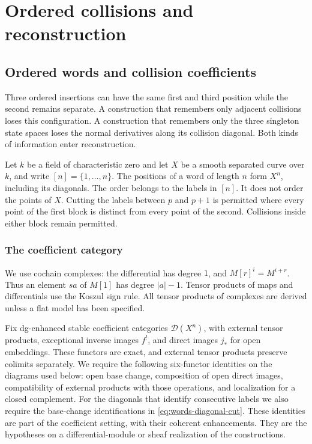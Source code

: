 \part{Ordered collisions and reconstruction}

\chapter{Ordered words and collision coefficients}
\label{chap:collision-words}

Three ordered insertions can have the same first and third position while
the second remains separate.  A construction that remembers only adjacent
collisions loses this configuration.  A construction that remembers only
the three singleton state spaces loses the normal derivatives along its
collision diagonal.  Both kinds of information enter reconstruction.

Let \(k\) be a field of characteristic zero and let \(X\) be a smooth
separated curve over \(k\), and write \([n]=\{1,\ldots,n\}\).
The positions of a word of length \(n\) form \(X^n\), including its
diagonals.  The order belongs to the labels in \([n]\).
It does not order the points of \(X\).  Cutting the labels
between \(p\) and \(p+1\) is permitted where every point of the first
block is distinct from every point of the second.  Collisions inside
either block remain permitted.

\section{The coefficient category}

We use cochain complexes: the differential has degree \(1\), and
\(M[r]^i=M^{i+r}\).  Thus an element \(sa\) of \(M[1]\) has degree
\(|a|-1\).  Tensor products of maps and differentials use the Koszul
sign rule.  All tensor products of complexes are derived unless a flat
model has been specified.

Fix dg-enhanced stable coefficient categories \(\mathscr D(X^n)\), with
external tensor products, exceptional inverse images \(f^!\), and
direct images \(j_*\) for open embeddings.  These functors are exact,
and external tensor products preserve colimits separately.
We require the following
six-functor identities on the diagrams used below: open base change,
composition of open direct images, compatibility of external products
with those operations, and localization for a closed complement.  For
the diagonals that identify consecutive labels we also require the
base-change identifications in \eqref{eq:words-diagonal-cut}.  These
identities are part of the coefficient setting, with their coherent
enhancements.  They are the hypotheses on a differential-module or
sheaf realization of the constructions.

